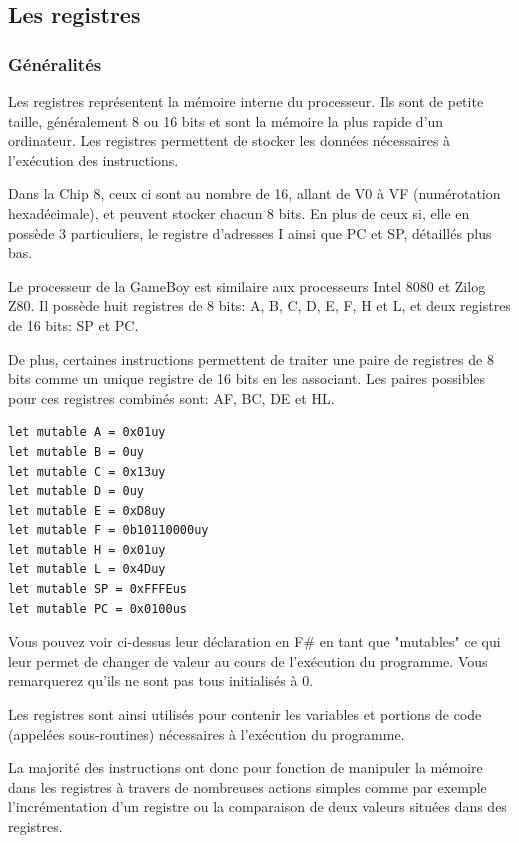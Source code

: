 \documentclass[12pt, a4paper]{article}
\begin{document}
\subsection{Les registres}

\subsubsection{Généralités}

Les registres représentent la mémoire interne du processeur. Ils sont de petite taille, généralement 8 ou 16 bits et sont la mémoire la plus rapide d'un ordinateur. Les registres permettent de stocker les données nécessaires à l'exécution des instructions.

Dans la Chip 8, ceux ci sont au nombre de 16, allant de V0 à VF (numérotation hexadécimale), et peuvent stocker chacun 8 bits. En plus de ceux si, elle en possède 3 particuliers, le registre d'adresses I ainsi que PC et SP, détaillés plus bas.

Le processeur de la GameBoy est similaire aux processeurs Intel 8080 et Zilog Z80. Il possède huit registres de 8 bits: A, B, C, D, E, F, H et L, et deux registres de 16 bits: SP et PC.

De plus, certaines instructions permettent de traiter une paire de registres de 8 bits comme un unique registre de 16 bits en les associant. Les paires possibles pour ces registres combinés sont: AF, BC, DE et HL.

\pagebreak
\bigskip
\bigskip
\small \begin{lstlisting}[frame=single]
let mutable A = 0x01uy
let mutable B = 0uy
let mutable C = 0x13uy
let mutable D = 0uy
let mutable E = 0xD8uy
let mutable F = 0b10110000uy
let mutable H = 0x01uy
let mutable L = 0x4Duy
let mutable SP = 0xFFFEus
let mutable PC = 0x0100us
\end{lstlisting}
\bigskip
\bigskip
\large

Vous pouvez voir ci-dessus leur déclaration en F\# en tant que "mutables" ce qui leur permet de changer de valeur au cours de l'exécution du programme. Vous remarquerez qu'ils ne sont pas tous initialisés à 0.

Les registres sont ainsi utilisés pour contenir les variables et portions de code (appelées sous-routines) nécessaires à l'exécution du programme. 


La majorité des instructions ont donc pour fonction de manipuler la mémoire dans les registres à travers de nombreuses actions simples comme par exemple l'incrémentation d'un registre ou la comparaison de deux valeurs situées dans des registres.
\end{document}
